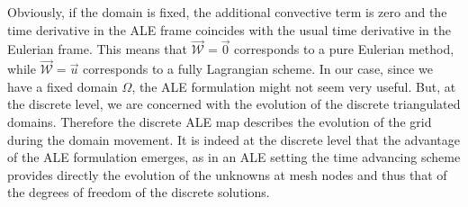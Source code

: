 \documentclass[a4paper,12pt,onecolumn]{article}
\newcommand{\W}{\vec{\mathcal W}}
\begin{document}
Obviously, if the domain is fixed, the additional convective term is zero
and the time derivative in the ALE frame coincides with the usual time
derivative in the Eulerian frame. This means that $\W=\vec 0$ corresponds to a
pure Eulerian method, while $\W=\vec u$ corresponds to a fully Lagrangian
scheme. In our case, since we have a fixed domain $\Omega$, the ALE formulation
might not seem very useful. But, at the discrete level, we are concerned with
the evolution of the discrete triangulated domains. Therefore the discrete ALE
map describes the evolution of the grid during the domain movement. It is
indeed at the discrete level that the advantage of the ALE formulation emerges,
as in an ALE setting the time advancing scheme provides directly the evolution
of the unknowns at mesh nodes and thus that of the degrees of freedom of the
discrete solutions.
\end{document}
